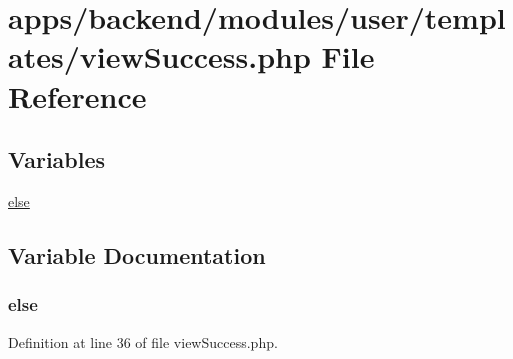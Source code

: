 \hypertarget{backend_2modules_2user_2templates_2view_success_8php}{\section{apps/backend/modules/user/templates/view\-Success.php File Reference}
\label{backend_2modules_2user_2templates_2view_success_8php}
}
\subsection*{Variables}
\begin{DoxyCompactItemize}
\item 
\hyperlink{backend_2modules_2user_2templates_2view_success_8php_a0544c3fe466e421738dae463968b70ba}{else}
\end{DoxyCompactItemize}


\subsection{Variable Documentation}
\hypertarget{backend_2modules_2user_2templates_2view_success_8php_a0544c3fe466e421738dae463968b70ba}{
\subsubsection[{else}]{\setlength{\rightskip}{0pt plus 5cm}else}}\label{backend_2modules_2user_2templates_2view_success_8php_a0544c3fe466e421738dae463968b70ba}


Definition at line 36 of file view\-Success.\-php.

